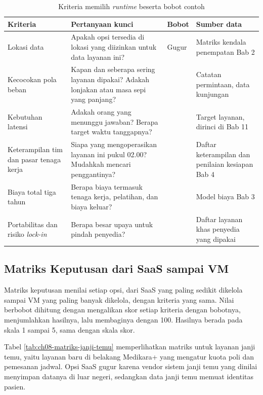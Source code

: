 \begin{table}[!htb]
  \centering
  \caption{Kriteria memilih \textit{runtime} beserta bobot contoh}
  \label{tab:ch08-kriteria}
  \footnotesize
  \begin{tabularx}{\textwidth}{>{\raggedright\arraybackslash}p{2.6cm}
      >{\raggedright\arraybackslash}X >{\raggedright\arraybackslash}p{1.1cm}
      >{\raggedright\arraybackslash}p{2.6cm}}
    \hline
    \textbf{Kriteria} & \textbf{Pertanyaan kunci} & \textbf{Bobot} & \textbf{Sumber data} \\ \hline
    Lokasi data & Apakah opsi tersedia di lokasi yang diizinkan untuk data layanan ini? & Gugur &
      Matriks kendala penempatan Bab 2 \\ \hline
    Kecocokan pola beban & Kapan dan seberapa sering layanan dipakai? Adakah lonjakan atau masa
      sepi yang panjang? & 25 & Catatan permintaan, data kunjungan \\ \hline
    Kebutuhan latensi & Adakah orang yang menunggu jawaban? Berapa target waktu tanggapnya? & 15
      & Target layanan, dirinci di Bab 11 \\ \hline
    Keterampilan tim dan pasar tenaga kerja & Siapa yang mengoperasikan layanan ini pukul 02.00?
      Mudahkah mencari penggantinya? & 25 & Daftar keterampilan dan penilaian kesiapan Bab 4 \\ \hline
    Biaya total tiga tahun & Berapa biaya termasuk tenaga kerja, pelatihan, dan biaya keluar? & 20
      & Model biaya Bab 3 \\ \hline
    Portabilitas dan risiko \textit{lock-in} & Berapa besar upaya untuk pindah penyedia? & 15 &
      Daftar layanan khas penyedia yang dipakai \\ \hline
  \end{tabularx}
\end{table}

\subsection{Matriks Keputusan dari SaaS sampai VM}

Matriks keputusan menilai setiap opsi, dari SaaS yang paling sedikit dikelola sampai VM yang
paling banyak dikelola, dengan kriteria yang sama. Nilai berbobot dihitung dengan mengalikan skor
setiap kriteria dengan bobotnya, menjumlahkan hasilnya, lalu membaginya dengan 100. Hasilnya
berada pada skala 1 sampai 5, sama dengan skala skor.

Tabel \ref{tab:ch08-matriks-janji-temu} memperlihatkan matriks untuk layanan janji temu, yaitu
layanan baru di belakang Medikara+ yang mengatur kuota poli dan pemesanan jadwal. Opsi SaaS gugur
karena vendor sistem janji temu yang dinilai menyimpan datanya di luar negeri, sedangkan data janji
temu memuat identitas pasien.

